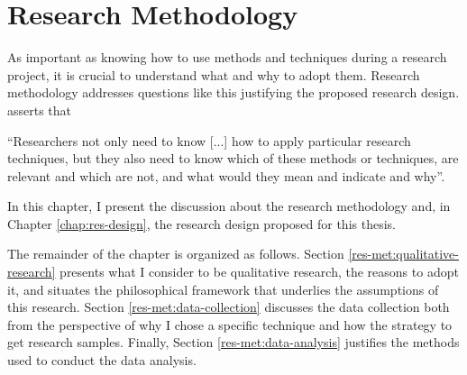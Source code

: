 \chapter{Research Methodology}
\label{chap:res-methodology}

As important as knowing how to use methods and techniques during a research project, it is crucial to understand what and why to adopt them. Research methodology addresses questions like this justifying the proposed research design.  asserts that 
\begin{citacao}
    “Researchers not only need to know [...] how to apply particular research techniques, but they also need to know which of these methods or techniques, are relevant and which are not, and what would they mean and indicate and why”.
\end{citacao}
In this chapter, I present the discussion about the research methodology and, in Chapter \ref{chap:res-design}, the research design proposed for this thesis.

The remainder of the chapter is organized as follows. Section \ref{res-met:qualitative-research} presents what I consider to be qualitative research, the reasons to adopt it, and situates the philosophical framework that underlies the assumptions of this research. Section \ref{res-met:data-collection} discusses the data collection both from the perspective of why I chose a specific technique and how the strategy to get research samples. Finally, Section \ref{res-met:data-analysis} justifies the methods used to conduct the data analysis.
